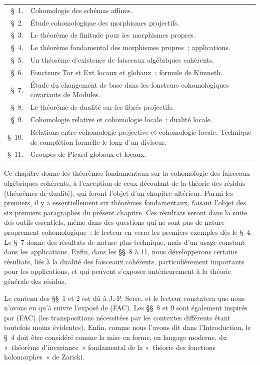 \medskip
\begin{tabular}{@{}r@{\ }p{}@{}}
\S~1. & Cohomologie des schémas affines.\\
\S~2. & Étude cohomologique des morphismes projectifs.\\
\S~3. & Le théorème de finitude pour les morphismes propres.\\
\S~4. & Le théorème fondamental des morphismes propres~; applications.\\
\S~5. & Un théorème d'existence de faisceaux algébriques cohérents.\\
\S~6. & Foncteurs Tor et Ext locaux et globaux~; formule de Künneth.\\
\S~7. & Étude du changement de base dans les foncteurs cohomologiques
covariants de Modules.\\
\S~8. & Le théorème de dualité sur les fibrés projectifs.\\
\S~9. & Cohomologie relative et cohomologie locale~; dualité locale.\\
\S~10. & Relations entre cohomologie projective et cohomologie locale.
Technique de complétion formelle le long d'un diviseur.\\
\S~11. & Groupes de Picard globaux et locaux\footnotemark.
\end{tabular}

\medskip
Ce chapitre donne les théorèmes fondamentaux sur la cohomologie des faisceaux
algébriques cohérents, à l'exception de ceux découlant de la théorie des
résidus (théorèmes de dualité), qui feront l'objet d'un chapitre ultérieur.
Parmi les premiers, il y a essentiellement six théorèmes fondamentaux,
faisant l'objet des six premiers paragraphes du présent chapitre. Ces
résultats seront dans la suite des outils essentiels, même dans des questions
qui ne sont pas de nature proprement cohomologique~; le lecteur en verra les
premiers exemples dès le \S~4. Le \S~7 donne des résultats de nature plus
technique, mais d'un usage constant dans les applications. Enfin, dans les
\S\S~8 à 11, nous développerons certains résultats, liés à la dualité des
faisceaux cohérents, particulièrement importants pour les applications, et
qui peuvent s'exposer antérieurement à la théorie générale des résidus.


Le contenu des \S\S~1 et 2 est dû à J.-P. Serre, et le lecteur constatera que
nous n'avons eu qu'à suivre l'exposé de (FAC). Les \S\S~8 et 9 sont également
inspirés par (FAC) (les transpositions nécessitées par les contextes
différents étant toutefois moins évidentes). Enfin, comme nous l'avons dit
dans l'Introduction, le \S~4 doit être considéré comme la mise en forme, en
langage moderne, du «~théorème d'invariance~» fondamental de la «~théorie des
fonctions holomorphes~» de Zariski.

